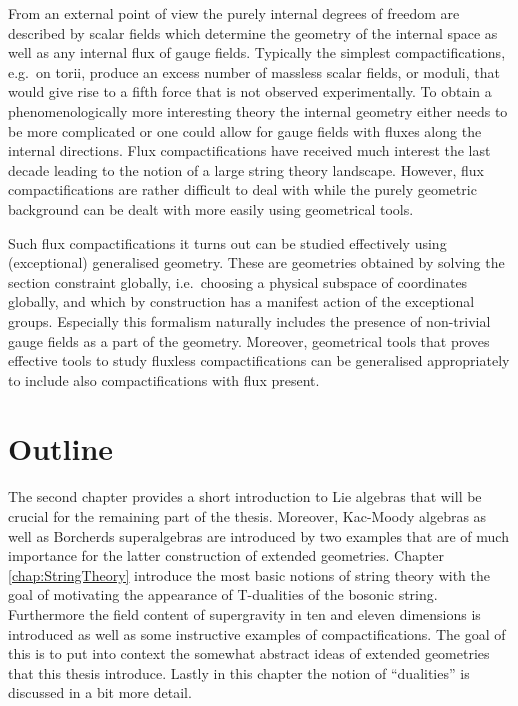 From an external point of view the purely internal degrees of freedom are described by scalar fields which determine the geometry of the internal space as well as any internal flux of gauge fields. Typically the simplest compactifications, e.g.\ on torii, produce an excess number of massless scalar fields, or moduli, that would give rise to a fifth force that is not observed experimentally. To obtain a phenomenologically more interesting theory the internal geometry either needs to be more complicated or one could allow for gauge fields with fluxes along the internal directions. Flux compactifications \cite{Grana:2005jc} have received much interest the last decade leading to the notion of a large string theory landscape. However, flux compactifications are rather difficult to deal with while the purely geometric background can be dealt with more easily using geometrical tools. 

Such flux compactifications it turns out can be studied effectively using (exceptional) generalised geometry. These are geometries obtained by solving the section constraint globally, i.e.\ choosing a physical subspace of coordinates globally, and which by construction has a manifest action of the exceptional groups. Especially this formalism naturally includes the presence of non-trivial gauge fields as a part of the geometry. Moreover, geometrical tools that proves effective tools to study fluxless compactifications can be generalised appropriately to include also compactifications with flux present. \cite{Grana:2009im,Grana:2016dyl,Coimbra:2012af,Ashmore:2015joa}

\section{Outline}
The second chapter provides a short introduction to Lie algebras that will be crucial for the remaining part of the thesis. Moreover, Kac-Moody algebras as well as Borcherds superalgebras are introduced by two examples that are of much importance for the latter construction of extended geometries. Chapter \ref{chap:StringTheory} introduce the most basic notions of string theory with the goal of motivating the appearance of T-dualities of the bosonic string. Furthermore the field content of supergravity in ten and eleven dimensions is introduced as well as some instructive examples of compactifications. The goal of this is to put into context the somewhat abstract ideas of extended geometries that this thesis introduce. Lastly in this chapter the notion of ``dualities'' is discussed in a bit more detail. 

